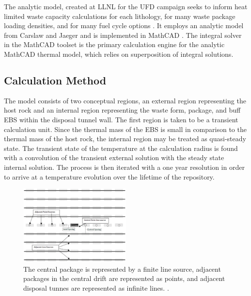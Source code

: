 The analytic model, created at \gls{LLNL} for the \gls{UFD} campaign seeks to 
inform heat limited waste capacity calculations for each lithology, for many 
waste package loading densities, and for many fuel cycle options 
\cite{hardin_generic_2011, greenberg_investigations_2012, 
greenberg_application_2012}. It employs an analytic model from Carslaw and 
Jaeger and is implemented in MathCAD \cite{carslaw_conduction_1959, 
ptc_mathcad_2010}.  The integral solver in the MathCAD toolset is the primary 
calculation engine for the analytic MathCAD thermal model, which relies on 
superposition of integral solutions.  

\subsection{Calculation Method}

The model consists of two conceptual regions, an external region representing 
the host rock and an internal region representing the waste form, package, and 
buff \gls{EBS} within the disposal tunnel wall. The first region is taken to be  
a transient calculation unit.  Since the thermal mass of the \gls{EBS} is small 
in comparison to the thermal mass of the host rock, the internal region may be 
treated as quasi-steady state. The transient state of the temperature at the 
calculation radius is found with a convolution of the transient external 
solution with the steady state internal solution.  The process is then iterated 
with a one year resolution in order to arrive at a temperature evolution over 
the lifetime of the repository. 

\begin{figure}[h!]
  \begin{center}
    \includegraphics[width=0.5\textwidth]{./chapters/litrev/llnlConcept.eps}
  \end{center}
  \caption{The central package is represented by a finite line source, adjacent 
  packages in the central drift are represented as points, and adjacent disposal 
  tunnes are represented as infinite lines.
  \cite{greenberg_investigations_2012}.}
  \label{fig:llnl}
\end{figure}

